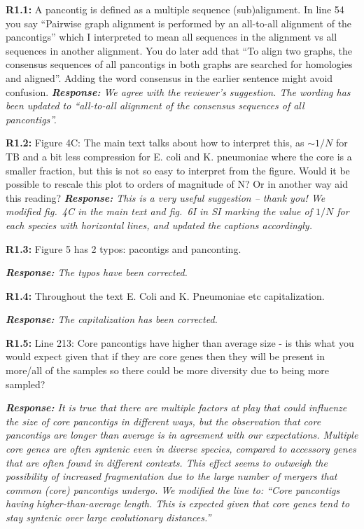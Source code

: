 \documentclass[aps,rmp,onecolumn]{revtex4-1}
\newcommand{\reviewer}[2]{\textbf{#1:} #2\vskip 5mm}
\newcommand{\response}[1]{{\it {\color{response}\textbf{Response:} #1}}\vskip 5mm}
\newcommand{\SIfigBenchmark}{6}
\begin{document}
\reviewer{R1.1}{A pancontig is defined as a multiple sequence (sub)alignment. In line 54 you say ``Pairwise graph alignment is performed by an all-to-all alignment of the pancontigs'' which I interpreted to mean all sequences in the alignment vs all sequences in another alignment. You do later add that ``To align two graphs, the consensus sequences of all pancontigs in both graphs are searched for homologies and aligned''. Adding the word consensus in the earlier sentence might avoid confusion.}
\response{We agree with the reviewer's suggestion. The wording has been updated to ``all-to-all alignment of the consensus sequences of all \textit{pancontigs}''.}

\reviewer{R1.2}{Figure 4C: The main text talks about how to interpret this, as $\sim 1/N$ for TB and a bit less compression for E. coli and K. pneumoniae where the core is a smaller fraction, but this is not so easy to interpret from the figure. Would it be possible to rescale this plot to orders of magnitude of N? Or in another way aid this reading?}
\response{This is a very useful suggestion -- thank you! We modified fig.~4C in the main text and fig.~{\SIfigBenchmark}I in SI marking the value of $1/N$ for each species with horizontal lines, and updated the captions accordingly.}

\reviewer{R1.3}{Figure 5 has 2 typos: pacontigs and panconting.}

\response{The typos have been corrected.}

\reviewer{R1.4}{Throughout the text E. Coli and K. Pneumoniae etc capitalization.}

\response{The capitalization has been corrected.}

\reviewer{R1.5}{Line 213: Core pancontigs have higher than average size - is this what you would expect given that if they are core genes then they will be present in more/all of the samples so there could be more diversity due to being more sampled?}

\response{It is true that there are multiple factors at play that could influenze the size of core pancontigs in different ways, but the observation that core pancontigs are longer than average is in agreement with our expectations. Multiple core genes are often syntenic even in diverse species, compared to accessory genes that are often found in different contexts. This effect seems to outweigh the possibility of increased fragmentation due to the large number of mergers that common (core) pancontigs undergo.
We modified the line to: ``Core pancontigs having higher-than-average length. This is expected given that core genes tend to stay syntenic over large evolutionary distances.''}
\end{document}

